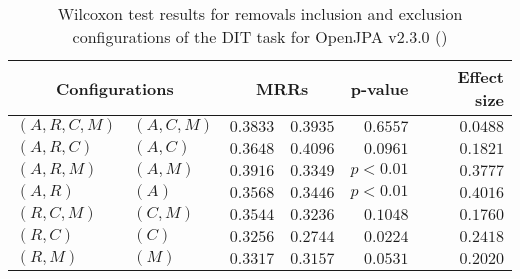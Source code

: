 
\begin{table}
\begin{spacing}{1.2}
\centering
\caption{Wilcoxon test results for removals inclusion and exclusion configurations of the DIT task for OpenJPA v2.3.0 (\ctwo)}
\label{table:versus-wilcox-openjpa-dit-removals}
\begin{tabular}{ll|rr|rr}
\toprule
      \multicolumn{2}{c|}{Configurations} &                \multicolumn{2}{c|}{MRRs} &             p-value & Effect size \\
\midrule
 $(A,R,C,M)$ &  $(A,C,M)$ &       $0.3833$ &  $\bm{0.3935}$ & $0.6557$ &    $0.0488$ \\
   $(A,R,C)$ &    $(A,C)$ &       $0.3648$ &  $\bm{0.4096}$ & $0.0961$ &    $0.1821$ \\
   $(A,R,M)$ &    $(A,M)$ &  $\bm{0.3916}$ &       $0.3349$ & $p<0.01$ &    $0.3777$ \\
     $(A,R)$ &      $(A)$ &  $\bm{0.3568}$ &       $0.3446$ & $p<0.01$ &    $0.4016$ \\
   $(R,C,M)$ &    $(C,M)$ &  $\bm{0.3544}$ &       $0.3236$ & $0.1048$ &    $0.1760$ \\
     $(R,C)$ &      $(C)$ &  $\bm{0.3256}$ &       $0.2744$ & $0.0224$ &    $0.2418$ \\
     $(R,M)$ &      $(M)$ &  $\bm{0.3317}$ &       $0.3157$ & $0.0531$ &    $0.2020$ \\
\bottomrule
\end{tabular}

\end{spacing}
\end{table}

